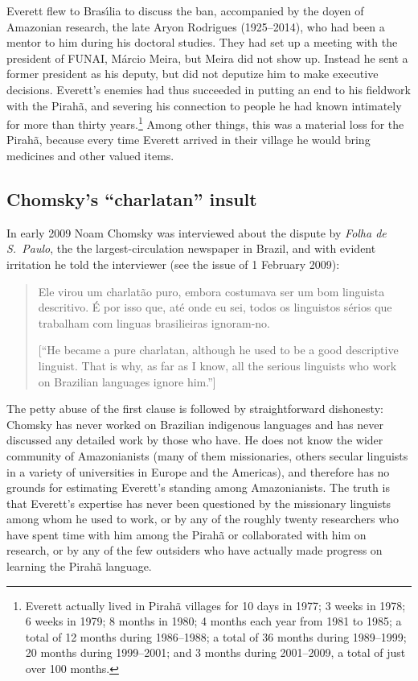 \documentclass[output=paper,colorlinks,citecolor=brown
]{langscibook}
\begin{document}
Everett flew to Bras{\'\i}lia to discuss the ban, accompanied by the
doyen of Amazonian research, the late Aryon Rodrigues (1925--2014),
who had been a mentor to him during his doctoral studies. They had
set up a meeting with the president of FUNAI, M{\'a}rcio Meira, but
Meira did not show up. Instead he sent a former president as his
deputy, but did not deputize him to make executive decisions.
Everett's enemies had thus succeeded in putting an end to his fieldwork
with the Pirahã, and severing his connection to people he had known
intimately for more than thirty years.\footnote{%
   Everett actually lived in Pirahã villages for 10 days in 1977;
   3 weeks in 1978; 6 weeks in 1979; 8 months in 1980; 4 months each year
   from 1981 to 1985; a total of 12 months during 1986--1988; a total of
   36 months during 1989--1999; 20 months during 1999--2001; and 3 months
   during 2001--2009, a total of just over 100 months.}
Among other things, this was a material loss for the Pirahã, because
every time Everett arrived in their village he would bring medicines and
other valued items.

\subsection{Chomsky's ``charlatan'' insult}

In early 2009 Noam Chomsky was interviewed about the dispute by
\textit{Folha de S.~Paulo}, the the largest-circulation newspaper in
Brazil, and with evident irritation he told the interviewer (see the
issue of 1 February 2009):
\begin{quote}
Ele virou um charlat{ã}o puro, embora costumava ser um bom linguista
descritivo. {\'E} por isso que, at{\'e} onde eu sei, todos os linguistos
s{\'e}rios que trabalham com linguas brasilieiras ignoram-no.

[``He became a pure charlatan, although he used to be a good descriptive
linguist. That is why, as far as I know, all the serious linguists
who work on Brazilian languages ignore him.'']
\end{quote}

The petty abuse of the first clause is followed by straightforward
dishonesty: Chomsky has never worked on Brazilian indigenous languages
and has never discussed any detailed work by those who have. He does
not know the wider community of Amazonianists (many of them missionaries,
others secular linguists in a variety of universities in Europe and the
Americas), and therefore has no grounds for estimating Everett's standing
among Amazonianists. The truth is that Everett's expertise has never been
questioned by the missionary linguists among whom he used to work, or by
any of the roughly twenty researchers who have spent time with him among
the Pirahã or collaborated with him on research, or by any of the
few outsiders who have actually made progress on learning the Pirahã
language.
\end{document}
